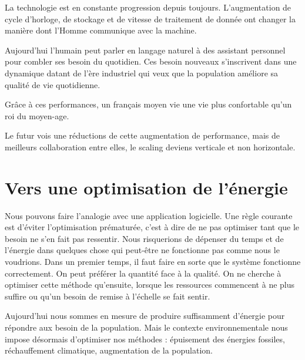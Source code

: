 La technologie est en constante progression depuis toujours.
L'augmentation de cycle d'horloge, de stockage et de vitesse de traitement de donnée
ont changer la manière dont l'Homme communique avec la machine.

Aujourd'hui l'humain peut parler en langage naturel à des assistant personnel pour combler ses
besoin du quotidien.
Ces besoin nouveaux s'inscrivent dans une dynamique datant de l'ère industriel qui veux que
la population améliore sa qualité de vie quotidienne.

Grâce à ces performances, un français moyen vie une vie plus confortable qu'un roi
du moyen-age.

Le futur vois une réductions de cette augmentation de performance, mais de meilleurs collaboration
entre elles, le scaling deviens verticale et non horizontale.



\section{Vers une optimisation de l'énergie}

Nous pouvons faire l’analogie avec une application logicielle. Une règle courante est d’éviter
l’optimisation prématurée, c’est à dire de ne pas optimiser tant que le besoin ne s’en fait pas
ressentir. Nous risquerions de dépenser du temps et de l'énergie dans quelques chose qui
peut-être ne fonctionne pas comme nous le voudrions.
Dans un premier temps, il faut faire en sorte que le système fonctionne correctement.
On peut préférer la quantité face à la qualité. On ne cherche à optimiser cette méthode
qu’ensuite, lorsque les ressources commencent à ne plus suffire ou qu’un besoin de remise
à l’échelle se fait sentir.

Aujourd'hui nous sommes en mesure de produire suffisamment d’énergie pour répondre aux
besoin de la population. Mais le contexte environnementale nous impose désormais d’optimiser
nos méthodes : épuisement des énergies fossiles, réchauffement climatique, augmentation de la
population.
